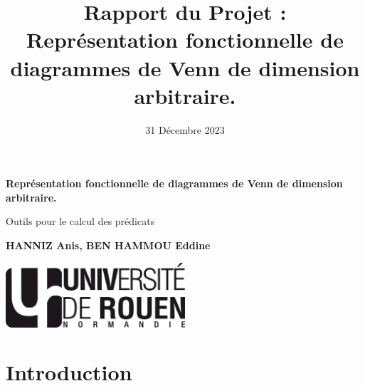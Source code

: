 \documentclass{article}
\begin{document}
\begin{titlepage}
   \begin{center}
       \vspace*{1cm}

       \textbf{Représentation fonctionnelle de diagrammes de Venn de dimension arbitraire.}

       \vspace{0.5cm}
        Outils pour le calcul des prédicats
            
       \vspace{1.5cm}

       \textbf{HANNIZ Anis, BEN HAMMOU Eddine}

       \vfill
            
       \vspace{0.8cm}
     
       \includegraphics[width=0.5\textwidth]{rouen}
            
   \end{center}
\end{titlepage}
\title{Rapport du Projet : Représentation fonctionnelle de
diagrammes de Venn de dimension arbitraire.}
\date{31 Décembre 2023}

\maketitle
\renewcommand{\contentsname}{Contenu}
\tableofcontents
\newpage
\section{Introduction}
	
\end{document}

